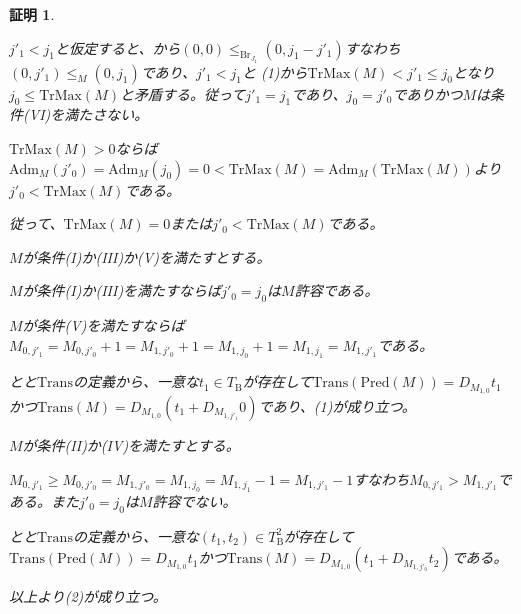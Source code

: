 \documentclass[dvipdfmx,uplatex]{jsarticle}
\theoremstyle{customnonumberbreakfortheorem}
\theoremstyle{customnonumberbreakforproof}
\newtheorem{hideableproof}{証明}
\begin{document}
\begin{hideableproof}
\begin{indented}
\begin{indented}
\begin{indented}
				\item \(j'_1 < j_1\)と仮定すると、から\((0,0) \leq_{\textrm{Br}_{J_1}} (0,j_1-j'_1)\)すなわち\((0,j'_1) \leq_M (0,j_1)\)であり、\(j'_1 < j_1\)と (1)から\(\textrm{TrMax}(M) < j'_1 \leq j_0\)となり\(j_0 \leq \textrm{TrMax}(M)\)と矛盾する。従って\(j'_1 = j_1\)であり、\(j_0 = j'_0\)でありかつ\(M\)は条件(VI)を満たさない。
				\item \(\textrm{TrMax}(M) > 0\)ならば\(\textrm{Adm}_M(j'_0) = \textrm{Adm}_M(j_0) = 0 < \textrm{TrMax}(M) = \textrm{Adm}_M(\textrm{TrMax}(M))\)より\(j'_0 < \textrm{TrMax}(M)\)である。
				\item 従って、\(\textrm{TrMax}(M) = 0\)または\(j'_0 < \textrm{TrMax}(M)\)である。
				\item \(M\)が条件(I)か(III)か(V)を満たすとする。
				\begin{indented}
					\item \(M\)が条件(I)か(III)を満たすならば\(j'_0 = j_0\)は\(M\)許容である。
					\item \(M\)が条件(V)を満たすならば\(M_{0,j'_1} = M_{0,j'_0}+1 = M_{1,j'_0}+1 = M_{1,j_0}+1 = M_{1,j_1} = M_{1,j'_1}\)である。
					\item {}とと\(\textrm{Trans}\)の定義から、一意な\(t_1 \in T_{\textrm{B}}\)が存在して\(\textrm{Trans}(\textrm{Pred}(M)) = D_{M_{1,0}} t_1\)かつ\(\textrm{Trans}(M) = D_{M_{1,0}}(t_1 + D_{M_{1,j'_1}} 0)\)であり、(1)が成り立つ。
				\end{indented}
				\item \(M\)が条件(II)か(IV)を満たすとする。
				\begin{indented}
					\item \(M_{0,j'_1} \geq M_{0,j'_0} = M_{1,j'_0} = M_{1,j_0} = M_{1,j_1}-1 = M_{1,j'_1}-1\)すなわち\(M_{0,j'_1} > M_{1,j'_1}\)である。また\(j'_0 = j_0\)は\(M\)許容でない。
					\item {}とと\(\textrm{Trans}\)の定義から、一意な\((t_1,t_2) \in T_{\textrm{B}}^2\)が存在して\(\textrm{Trans}(\textrm{Pred}(M)) = D_{M_{1,0}} t_1\)かつ\(\textrm{Trans}(M) = D_{M_{1,0}}(t_1 + D_{M_{1,j'_0}} t_2)\)である。
					\item 以上より(2)が成り立つ。
				\end{indented}
			\end{indented}
		\end{indented}
	\end{indented}
\end{hideableproof}
\end{document}
